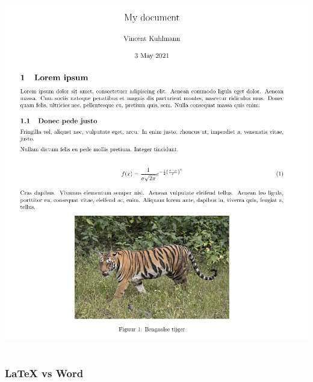 \documentclass[../presentatie.tex]{subfiles}
\def\named#1{}
\begin{document}
\begin{frame}
\begin{columns}
\begin{column}{0.5\textwidth}
                \includegraphics[width=\linewidth,height=0.8\textheight,keepaspectratio]{assets/1_Inleiding/basicDocLaTeXSnippet.png}
            \end{column}
        \end{columns}
    \end{frame}

    \named{intro-wordcomp-doc-eqfragment}
    \begin{frame}
        \frametitle{\LaTeX{} vs Word}

        \bgroup
        \setlength{\fboxsep}{0pt}
        \medskip

        \egroup
    \end{frame}
\end{document}
